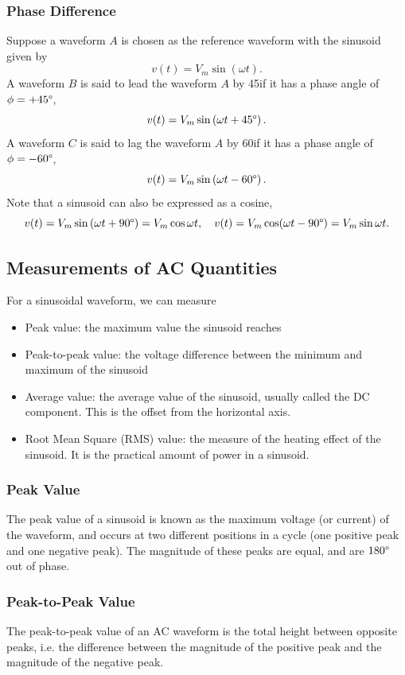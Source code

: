 \documentclass{article}
\begin{document}
\subsubsection{Phase Difference}
Suppose a waveform $A$ is chosen as the reference waveform with the sinusoid given by 
\[
    v(t)=V_m \sin(\omega t).
\]
A waveform $B$ is said to lead the waveform $A$ by 45\textdegree if it has a phase angle of $\phi =+45 \degree$,
\[
    v(t)=V_m \sin \left( \omega t+45\degree \right).
\]
A waveform $C$ is said to lag the waveform $A$ by 60\textdegree if it has a phase angle of $\phi =-60\degree$,
\[
    v(t)=V_m\sin \left( \omega t-60\degree \right).
\]
Note that a sinusoid can also be expressed as a cosine,
\[
    v(t)=V_m\sin \left( \omega t+90\degree \right)=V_m\cos\omega t,\quad v(t)=V_m\cos(\omega t-90\degree)=V_m\sin\omega t.
\]

\subsection{Measurements of AC Quantities}
For a sinusoidal waveform, we can measure
\begin{itemize}
    \item Peak value: the maximum value the sinusoid reaches
    \item Peak-to-peak value: the voltage difference between the minimum and maximum of the sinusoid
    \item Average value: the average value of the sinusoid, usually called the DC component. This is the offset from the horizontal axis.
    \item Root Mean Square (RMS) value: the measure of the heating effect of the sinusoid. It is the practical amount of power in a sinusoid.
\end{itemize}

\subsubsection{Peak Value}
The peak value of a sinusoid is known as the maximum voltage (or current) of the waveform, and occurs at two different positions in a cycle (one positive peak and one negative peak). The magnitude of these peaks are equal, and are $180\degree$ out of phase.

\subsubsection{Peak-to-Peak Value}
The peak-to-peak value of an AC waveform is the total height between opposite peaks, i.e. the difference between the magnitude of the positive peak and the magnitude of the negative peak.
\end{document}
